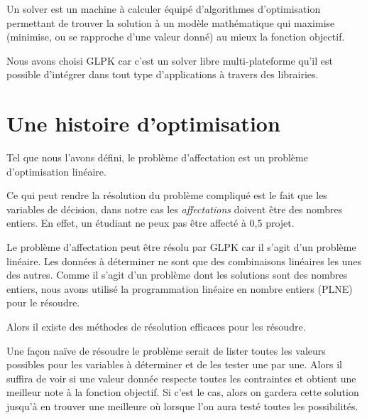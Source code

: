 \documentclass{polytech/polytech}
\begin{document}
Un solver est un machine à calculer équipé d'algorithmes d'optimisation permettant de trouver la solution à un modèle mathématique qui maximise (minimise, ou se rapproche d'une valeur donné) au mieux la fonction objectif.

Nous avons choisi GLPK car c'est un solver libre multi-plateforme qu'il est possible d'intégrer dans tout type d'applications à travers des librairies.

\section{Une histoire d'optimisation}

Tel que nous l'avons défini, le problème d'affectation est un problème d'optimisation linéaire. 

Ce qui peut rendre la résolution du problème compliqué est le fait que les variables de décision, dans notre cas les \textit{affectations} doivent être des nombres entiers. En effet, un étudiant ne peux pas être affecté à 0,5 projet.

Le problème d'affectation peut être résolu par GLPK car il s'agit d'un problème linéaire. Les données à déterminer ne sont que des combinaisons linéaires les unes des autres. Comme il s'agit d'un problème dont les solutions sont des nombres entiers, nous avons utilisé la programmation linéaire en nombre entiers (PLNE) pour le résoudre. 

Alors il existe des méthodes de résolution efficaces pour les résoudre. 

Une façon naïve de résoudre le problème serait de lister toutes les valeurs possibles pour les variables à déterminer et de les tester une par une. Alors il suffira de voir si une valeur donnée respecte toutes les contraintes et obtient une meilleur note à la fonction objectif. Si c'est le cas, alors on gardera cette solution jusqu'à en trouver une meilleure où lorsque l'on aura testé toutes les possibilités.







\end{document}
